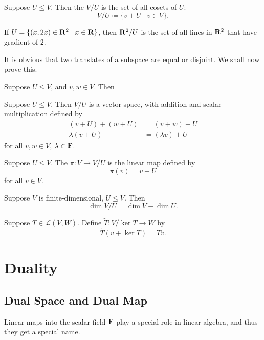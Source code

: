 \begin{definition}
Suppose $U\le V$. Then the  $V/U$ is the set of all cosets of $U$:
\[V/U\coloneqq\{v+U\mid v\in V\}.\]
\end{definition}

\begin{example}
If $U=\{(x,2x)\in\mathbf R^2\mid x\in\mathbf R\}$, then $\mathbf R^2/U$ is the set of all lines in $\mathbf R^2$ that have gradient of $2$.
\end{example}

It is obvious that two translates of a subspace are equal or disjoint. We shall now prove this.

\begin{proposition}
Suppose $U\le V$, and $v,w\in V$. Then
\end{proposition}

\begin{proposition}
Suppose $U\le V$. Then $V/U$ is a vector space, with addition and scalar multiplication defined by
\begin{align*}
(v+U)+(w+U)&=(v+w)+U\\
\lambda(v+U)&=(\lambda v)+U
\end{align*}
for all $v,w\in V$, $\lambda\in\mathbf F$.
\end{proposition}

\begin{definition}
Suppose $U\le V$. The  $\pi:V\to V/U$ is the linear map defined by
\[\pi(v)=v+U\]
for all $v\in V$.
\end{definition}

\begin{proposition}
Suppose $V$ is finite-dimensional, $U\le V$. Then
\[\dim V/U=\dim V-\dim U.\]
\end{proposition}

\begin{definition}
Suppose $T\in\mathcal{L}(V,W)$. Define $\tilde{T}:V/\ker T\to W$ by
\[\tilde{T}(v+\ker T)=Tv.\]
\end{definition}

\section{Duality}
\subsection{Dual Space and Dual Map}
Linear maps into the scalar field $\mathbf F$ play a special role in linear algebra, and thus they get a special name.

